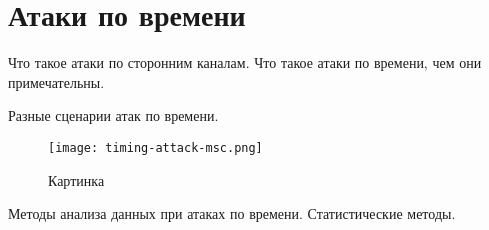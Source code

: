 \section{Атаки по времени}

Что такое атаки по сторонним каналам. Что такое атаки по времени, чем они примечательны.

Разные сценарии атак по времени. \cite{kek}

\begin{figure}[H]
    \centering
    \texttt{[image: timing-attack-msc.png]}
    \caption{Картинка}
\end{figure}

Методы анализа данных при атаках по времени. Статистические методы.

\clearpage
